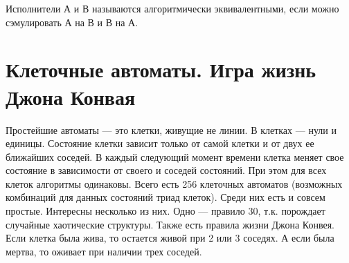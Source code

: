 Исполнители А и В называются алгоритмически эквивалентными, если можно сэмулировать А на В и В на А.

\section{Клеточные автоматы. Игра жизнь Джона Конвая}
Простейшие автоматы --- это клетки, живущие не линии. В клетках --- нули и единицы. Состояние клетки зависит только от самой клетки и от двух ее ближайших соседей. В каждый следующий момент времени клетка меняет свое состояние в зависимости от своего и соседей состояний. При этом для всех клеток алгоритмы одинаковы. Всего есть 256 клеточных автоматов (возможных комбинаций для данных состояний триад клеток). Среди них есть и совсем простые. Интересны несколько из них. Одно --- правило 30, т.к. порождает случайные хаотические структуры. Также есть правила жизни Джона Конвея. Если клетка была жива, то остается живой при 2 или 3 соседях. А если была мертва, то оживает при наличии трех соседей.